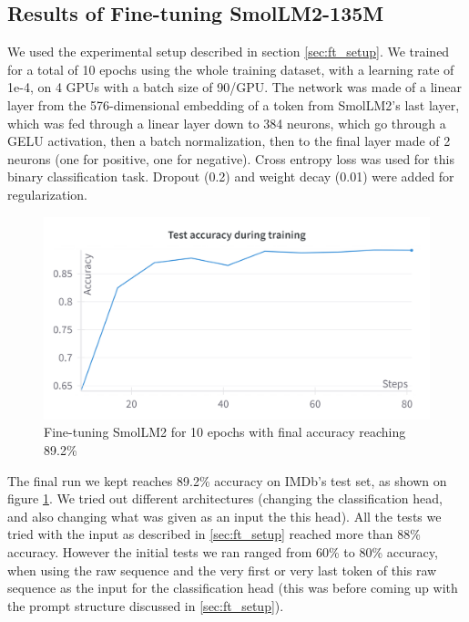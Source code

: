 \documentclass[10pt,twocolumn,letterpaper]{article}
\begin{document}
\subsection{Results of Fine-tuning SmolLM2-135M}

We used the experimental setup described in section \ref{sec:ft_setup}.
We trained for a total of 10 epochs using the whole training dataset, with a learning rate of 1e-4, on 4 GPUs with a batch size of 90/GPU. The network was made of a linear layer from the 576-dimensional embedding of a token from SmolLM2's last layer, which was fed through a linear layer down to 384 neurons, which go through a GELU activation, then a batch normalization, then to the final layer made of 2 neurons (one for positive, one for negative). Cross entropy loss was used for this binary classification task. Dropout (0.2) and weight decay (0.01) were added for regularization.

\begin{figure}[h]
    \centering
    \includegraphics[width=1\linewidth]{figures/W&B Chart 12_10_2024, 1_55_29 PM.png}
    \caption{Fine-tuning SmolLM2 for 10 epochs with final accuracy reaching 89.2\%}
    \label{fig:ft_train}
\end{figure}


The final run we kept reaches 89.2\% accuracy on IMDb's test set, as shown on figure \ref{fig:ft_train}. We tried out different architectures (changing the classification head, and also changing what was given as an input the this head). All the tests we tried with the input as described in \ref{sec:ft_setup} reached more than 88\% accuracy.
However the initial tests we ran ranged from 60\% to 80\% accuracy,  when using the raw sequence and the very first or very last token of this raw sequence as the input for the classification head (this was before coming up with the prompt structure discussed in \ref{sec:ft_setup}).
\end{document}
